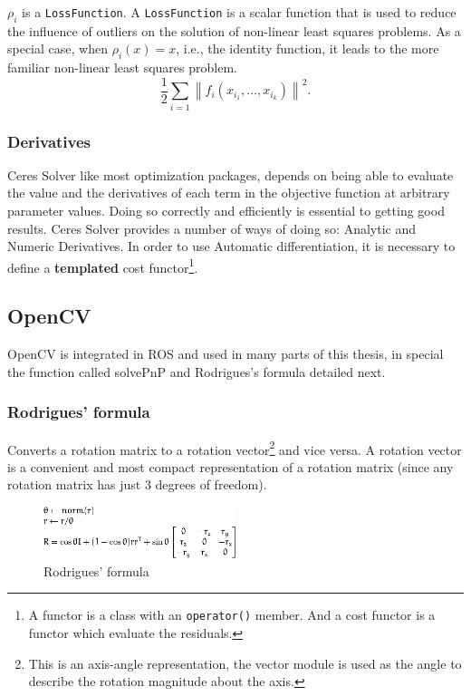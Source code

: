 $\rho_i$ is a \texttt{LossFunction}. A \texttt{LossFunction} is a scalar function that is used to reduce the influence of outliers on the solution of non-linear least squares problems. As a special case, when $\rho_i(x) = x$, i.e., the identity function, it leads to the more familiar non-linear least squares problem.
\[
 \frac{1}{2}\sum_{i=1} \left\|f_i\left(x_{i_1}, ... ,x_{i_k}\right)\right\|^2.
\]

\subsubsection*{Derivatives}
Ceres Solver like most optimization packages, depends on being able to evaluate the value and the derivatives of each term in the objective function at arbitrary parameter values. Doing so correctly and efficiently is essential to getting good results. Ceres Solver provides a number of ways of doing so: Analytic and Numeric Derivatives. In order to use Automatic differentiation, it is necessary to define a \textbf{templated} cost functor\footnote{A functor is a class with an \texttt{operator()} member. And a cost functor is a functor which evaluate the residuals.}.



\subsection{OpenCV}

OpenCV is integrated in ROS and used in many parts of this thesis, in special the function called solvePnP and Rodrigues's formula detailed next.


\subsubsection{Rodrigues' formula}

Converts a rotation matrix to a rotation vector\footnote{This is an axis-angle representation, the vector module is used as the angle to describe the rotation magnitude about the axis.} and vice versa. A rotation vector is a convenient and most compact representation of a rotation matrix (since any rotation matrix has just 3 degrees of freedom).

\begin{figure}[!htbp]
 \centering
 \includegraphics[width=0.5\textwidth]{images/rodrigues01.png}
 \caption{Rodrigues' formula}
 \label{fig:rodrigues}
\end{figure}

